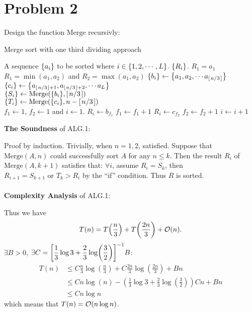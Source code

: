 \documentclass{article}
\begin{document}
\section*{Problem 2}
Design the function $\mathrm{Merge}$ recursivly:
\begin{algorithm}[H]
	\caption{Merge sort with one third dividing approach}
	\begin{algorithmic}
		\renewcommand{\algorithmicrequire}{\textbf{Input:}}
		\renewcommand{\algorithmicensure}{\textbf{Output:}}
		\REQUIRE A sequence $\qty{a_i}$ to be sorted where $i\in\qty{1,2, \cdots,L}$.
		\ENSURE $\qty{R_i}$.
		\STATE $R_1=a_1$
		\RETURN		
		\ENDIF
		\STATE $R_1=\min(a_1,a_2)$ and $R_2=\max(a_1,a_2)$
		\RETURN		
		\ENDIF
		\STATE $\qty{b_i}\gets \qty{a_1,a_2, \cdots a_{[\flatfrac{n}{3}]}}$
		\STATE $\qty{c_i}\gets \qty{a_{[\flatfrac{n}{3}]+1},a_{[\flatfrac{n}{3}]+2}, \cdots a_L}$\\[5pt]
		\STATE $\{S_i\}\gets\mathrm{Merge}\qty(\qty{b_i},[\flatfrac{n}{3}])$\\[4pt]
		\STATE $\{T_i\}\gets\mathrm{Merge}(\qty{c_i},n-[\flatfrac{n}{3}])$\\[4pt]
		\STATE $f_1\gets 1$, $f_2\gets 1$ and $i\gets 1$.
		\STATE $R_i\gets b_{f_1}$
		\STATE $f_1\gets f_1+1$
		\ELSE
			\STATE $R_i\gets c_{f_2}$
			\STATE $f_2\gets f_2+1$
		\ENDIF
		\STATE $i\gets i+1$
		\ENDWHILE
		\RETURN
	\end{algorithmic} 
\end{algorithm}
\textbf{The Soundness} of ALG.1: 

Proof by induction. Trivially, when $n=1,2$, satisfied. Suppose that $\mathrm{Merge}(A,n)$ could successfully sort  $A$ for any  $n\le k$. Then the result $R_i$ of $\mathrm{Merge}(A,k+1)$ satisfies that: $\forall i$, assume $R_{i}=S_k$, then  $R_{i+1}=S_{k+1}\mbox{ or }T_k>R_i$ by the ``if'' condition. Thus $R$ is sorted.
\\
\\
\textbf{Complexity Analysis} of ALG.1:

Thus we have
\[
	T(n)=T\qty(\frac{n}{3})+T\qty(\frac{2n}{3})+\mathcal{O}(n)
.\] 
$\exists B>0$, $\displaystyle \exists C=\qty[\frac{1}{3}\log3+\frac{2}{3}\log(\frac{3}{2})]^{-1}B$:
\[
	\begin{aligned}
		T(n)&\le
		C\frac{n}{3}\log(\frac{n}{3})+C\frac{2n}{3}\log(\frac{2n}{3})+Bn
		\\&\le
		Cn\log(n)-(\frac{1}{3}\log3+\frac{2}{3}\log(\frac{3}{2}))Cn+Bn
		\\[4pt]&\le
		Cn\log n
	\end{aligned}
\] which means that $T(n)=\mathcal{O}(n\log n)$.
\end{document}

